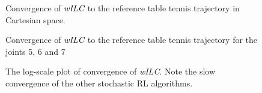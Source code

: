 \begin{figure}
\center
\scalebox{1.0}{}
\caption{Convergence of $\emph{wILC}$ to the reference table tennis trajectory in Cartesian space.}
\label{wILCTrajectoryTTCartesian}
\end{figure}

\begin{figure}
\center
\scalebox{1.0}{}
\caption{Convergence of $\emph{wILC}$ to the reference table tennis trajectory for the joints 5, 6 and 7}
\label{wILCTrajectoryTT}
\end{figure}

\begin{figure}
\begingroup
\scalebox{0.5}{}
\endgroup
\caption{The log-scale plot of convergence of \emph{wILC}. Note the slow convergence of the other stochastic RL algorithms.}
\label{ttComparison}
\end{figure}